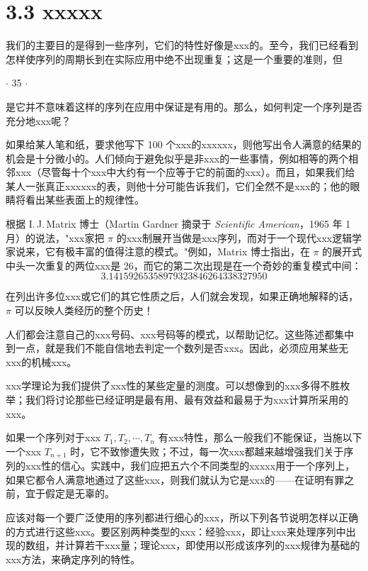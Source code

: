 \section*{3.3 \quad xxxxx}

我们的主要目的是得到一些序列，它们的特性好像是xxx的。至今，我们已经看到怎样使序列的周期长到在实际应用中绝不出现重复；这是一个重要的准则，但

\begin{flushright}
$\cdot$ 35 $\cdot$
\end{flushright}

\noindent 是它并不意味着这样的序列在应用中保证是有用的。那么，如何判定一个序列是否充分地xxx呢？

如果给某人笔和纸，要求他写下 100 个xxx的xxxxxx，则他写出令人满意的结果的机会是十分微小的。人们倾向于避免似乎是非xxx的一些事情，例如相等的两个相邻xxx（尽管每十个xxx中大约有一个应等于它的前面的xxx）。而且，如果我们给某人一张真正xxxxxx的表，则他十分可能告诉我们，它们全然不是xxx的；他的眼睛将看出某些表面上的规律性。

根据 I.\,J.\,Matrix 博士（Martin Gardner 摘录于 \textit{Scientific American}，1965 年 1 月）的说法，"xxx家把 $\pi$ 的xxx制展开当做是xxx序列，而对于一个现代xxx逻辑学家说来，它有极丰富的值得注意的模式。"例如，Matrix 博士指出，在 $\pi$ 的展开式中头一次重复的两位xxx是 26，而它的第二次出现是在一个奇妙的重复模式中间：
\begin{equation}
3.14159265358979323846264338327950 \tag{1}
\end{equation}

\noindent 在列出许多位xxx或它们的其它性质之后，人们就会发现，如果正确地解释的话，$\pi$ 可以反映人类经历的整个历史！

人们都会注意自己的xxx号码、xxx号码等的模式，以帮助记忆。这些陈述都集中到一点，就是我们不能自信地去判定一个数列是否xxx。因此，必须应用某些无xxx的机械xxx。

xxx学理论为我们提供了xxx性的某些定量的测度。可以想像到的xxx多得不胜枚举；我们将讨论那些已经证明是最有用、最有效益和最易于为xxx计算所采用的xxx。

如果一个序列对于xxx $T_1, T_2, \cdots, T_n$ 有xxx特性，那么一般我们不能保证，当施以下一个xxx $T_{n+1}$ 时，它不致惨遭失败；不过，每一次xxx都越来越增强我们关于序列的xxx性的信心。实践中，我们应把五六个不同类型的xxxxx用于一个序列上，如果它都令人满意地通过了这些xxx，则我们就认为它是xxx的——在证明有罪之前，宜于假定是无辜的。

应该对每一个要广泛使用的序列都进行细心的xxx，所以下列各节说明怎样以正确的方式进行这些xxx。要区别两种类型的xxx：经验xxx，即让xxx来处理序列中出现的数组，并计算若干xxx量；理论xxx，即使用以形成该序列的xxx规律为基础的xxx方法，来确定序列的特性。

